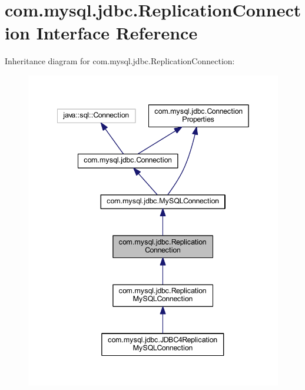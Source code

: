 \hypertarget{interfacecom_1_1mysql_1_1jdbc_1_1_replication_connection}{}\section{com.\+mysql.\+jdbc.\+Replication\+Connection Interface Reference}
\label{interfacecom_1_1mysql_1_1jdbc_1_1_replication_connection}


Inheritance diagram for com.\+mysql.\+jdbc.\+Replication\+Connection\+:
\nopagebreak
\begin{figure}[H]
\begin{center}
\leavevmode
\includegraphics[width=342pt]{interfacecom_1_1mysql_1_1jdbc_1_1_replication_connection__inherit__graph}
\end{center}
\end{figure}


